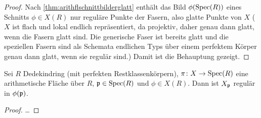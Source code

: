 \documentclass[german]{scrreprt}
\begin{document}
\begin{Satz}
\begin{proof}
      
      Nach \autoref{thm:arithflschnittbilderglatt} enthält das Bild
      $\phi(\operatorname{Spec}(R))$ eines Schnitts $\phi\in X(R)$ nur reguläre
      Punkte der Fasern, also glatte Punkte von $X$
      ($X$ ist flach und lokal endlich repräsentiert, da
      projektiv, daher genau dann glatt, wenn die Fasern glatt sind.
      Die generische Faser ist bereits glatt und die speziellen Fasern
      sind als Schemata endlichen Typs über einem perfektem Körper
      genau dann glatt, wenn sie regulär sind.)
      Damit ist die Behauptung gezeigt.
  \end{proof}
\end{Satz}


\begin{Lemma}\label{thm:arithflschnittbilderglatt}
  \cite[Proposition IV.4.3]{silverman2}
  Sei $R$ Dedekindring (mit perfekten Restklassenkörpern),
  $\pi\colon X\to\operatorname{Spec}(R)$ eine arithmetische Fläche über $R$,
  $\mathfrak{p}\in\operatorname{Spec}(R)$ und $\phi\in X(R)$.
  Dann ist $X_{\mathfrak{p}}$ regulär in $\phi(\mathfrak{p})$.
  \begin{proof}
    …
  \end{proof}
\end{Lemma}

\end{document}
